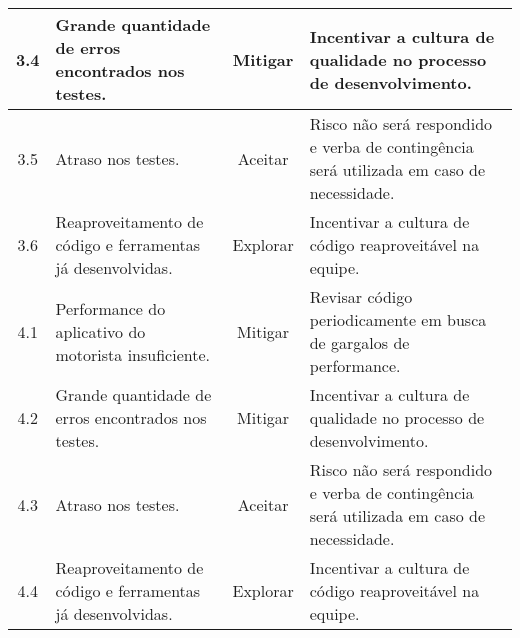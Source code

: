 \begin{longtable}{ c p{} c p{} }
	\midrule
	3.4                      & Grande quantidade de erros encontrados nos testes.                                                                                                                            & Mitigar                    & Incentivar a cultura de qualidade no processo de desenvolvimento.                                                                      \\
	\midrule
	3.5                      & Atraso nos testes.                                                                                                                                                            & Aceitar                    & Risco não será respondido e verba de contingência será utilizada em caso de necessidade.                                           \\
	\midrule
	3.6                      & Reaproveitamento de código e ferramentas já desenvolvidas.                                                                                                                  & Explorar                   & Incentivar a cultura de código reaproveitável na equipe.                                                                             \\
	\midrule
	4.1                      & Performance do aplicativo do motorista insuficiente.                                                                                                                          & Mitigar                    & Revisar código periodicamente em busca de gargalos de performance.                                                                    \\
	\midrule
	4.2                      & Grande quantidade de erros encontrados nos testes.                                                                                                                            & Mitigar                    & Incentivar a cultura de qualidade no processo de desenvolvimento.                                                                      \\
	\midrule
	4.3                      & Atraso nos testes.                                                                                                                                                            & Aceitar                    & Risco não será respondido e verba de contingência será utilizada em caso de necessidade.                                           \\
	\midrule
	4.4                      & Reaproveitamento de código e ferramentas já desenvolvidas.                                                                                                                  & Explorar                   & Incentivar a cultura de código reaproveitável na equipe.                                                                             \\

\end{longtable}
